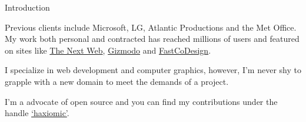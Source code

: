 \documentclass{resume} %
\begin{document}
\begin{rSection}{Introduction}
\item Previous clients include Microsoft, LG, Atlantic Productions and the Met Office. My work both personal and contracted has reached millions of users and featured on sites like \href{http://thenextweb.com/creativity/2015/05/15/webgl-fluid-experiment-is-a-browser-based-lsd-trip/}{The Next Web}, \href{http://www.gizmodo.co.uk/2014/11/just-try-and-stop-playing-with-this-fluid-simulator/}{Gizmodo} and \href{http://www.fastcodesign.com/3038725/this-wonderful-web-toy-turns-your-browser-into-magic-liquid}{FastCoDesign}.

\item I specialize in web development and computer graphics, however, I'm never shy to grapple with a new domain to meet the demands of a project.

\item I'm a advocate of open source and you can find my contributions under the handle \href{http://github.com/haxiomic}{`haxiomic'}.

\end{rSection}

\end{document}
